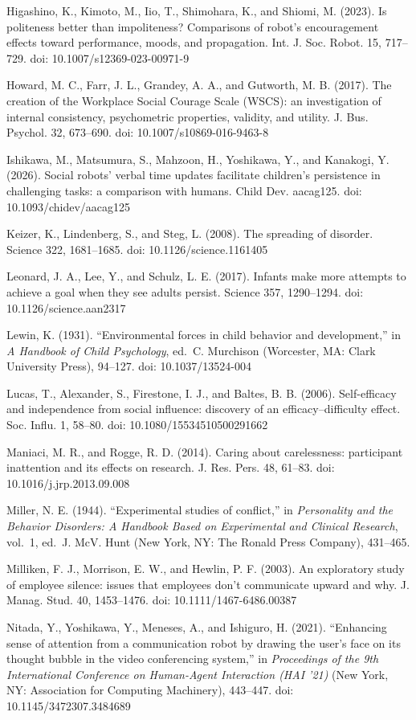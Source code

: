 Higashino, K., Kimoto, M., Iio, T., Shimohara, K., and Shiomi, M.
(2023). Is politeness better than impoliteness? Comparisons of robot's
encouragement effects toward performance, moods, and propagation. Int.
J. Soc. Robot. 15, 717--729. doi: 10.1007/s12369-023-00971-9

Howard, M. C., Farr, J. L., Grandey, A. A., and Gutworth, M. B. (2017).
The creation of the Workplace Social Courage Scale (WSCS): an
investigation of internal consistency, psychometric properties,
validity, and utility. J. Bus. Psychol. 32, 673--690. doi:
10.1007/s10869-016-9463-8

Ishikawa, M., Matsumura, S., Mahzoon, H., Yoshikawa, Y., and Kanakogi,
Y. (2026). Social robots' verbal time updates facilitate children's
persistence in challenging tasks: a comparison with humans. Child Dev.
aacag125. doi: 10.1093/chidev/aacag125

Keizer, K., Lindenberg, S., and Steg, L. (2008). The spreading of
disorder. Science 322, 1681--1685. doi: 10.1126/science.1161405

Leonard, J. A., Lee, Y., and Schulz, L. E. (2017). Infants make more
attempts to achieve a goal when they see adults persist. Science 357,
1290--1294. doi: 10.1126/science.aan2317

Lewin, K. (1931). ``Environmental forces in child behavior and
development,'' in \emph{A Handbook of Child Psychology}, ed.~C.
Murchison (Worcester, MA: Clark University Press), 94--127. doi:
10.1037/13524-004

Lucas, T., Alexander, S., Firestone, I. J., and Baltes, B. B. (2006).
Self-efficacy and independence from social influence: discovery of an
efficacy--difficulty effect. Soc. Influ. 1, 58--80. doi:
10.1080/15534510500291662

Maniaci, M. R., and Rogge, R. D. (2014). Caring about carelessness:
participant inattention and its effects on research. J. Res. Pers. 48,
61--83. doi: 10.1016/j.jrp.2013.09.008

Miller, N. E. (1944). ``Experimental studies of conflict,'' in
\emph{Personality and the Behavior Disorders: A Handbook Based on
Experimental and Clinical Research}, vol.~1, ed.~J. McV. Hunt (New York,
NY: The Ronald Press Company), 431--465.

Milliken, F. J., Morrison, E. W., and Hewlin, P. F. (2003). An
exploratory study of employee silence: issues that employees don't
communicate upward and why. J. Manag. Stud. 40, 1453--1476. doi:
10.1111/1467-6486.00387

Nitada, Y., Yoshikawa, Y., Meneses, A., and Ishiguro, H. (2021).
``Enhancing sense of attention from a communication robot by drawing the
user's face on its thought bubble in the video conferencing system,'' in
\emph{Proceedings of the 9th International Conference on Human-Agent
Interaction (HAI '21)} (New York, NY: Association for Computing
Machinery), 443--447. doi: 10.1145/3472307.3484689

